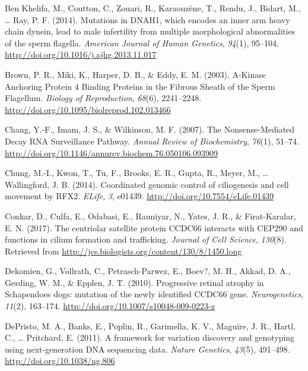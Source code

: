 \documentclass[12pt,twoside]{reedthesis}
\theoremstyle{definition}
\theoremstyle{definition}
\theoremstyle{remark}
\begin{document}
  \hypertarget{ref-BenKhelifa2014}{}
  Ben Khelifa, M., Coutton, C., Zouari, R., Karaouzène, T., Rendu, J.,
  Bidart, M., \ldots{} Ray, P. F. (2014). Mutations in DNAH1, which
  encodes an inner arm heavy chain dynein, lead to male infertility from
  multiple morphological abnormalities of the sperm flagella.
  \emph{American Journal of Human Genetics}, \emph{94}(1), 95--104.
  \url{http://doi.org/10.1016/j.ajhg.2013.11.017}
  
  \hypertarget{ref-Brown2003}{}
  Brown, P. R., Miki, K., Harper, D. B., \& Eddy, E. M. (2003). A-Kinase
  Anchoring Protein 4 Binding Proteins in the Fibrous Sheath of the Sperm
  Flagellum. \emph{Biology of Reproduction}, \emph{68}(6), 2241--2248.
  \url{http://doi.org/10.1095/biolreprod.102.013466}
  
  \hypertarget{ref-Chang2007}{}
  Chang, Y.-F., Imam, J. S., \& Wilkinson, M. F. (2007). The
  Nonsense-Mediated Decay RNA Surveillance Pathway. \emph{Annual Review of
  Biochemistry}, \emph{76}(1), 51--74.
  \url{http://doi.org/10.1146/annurev.biochem.76.050106.093909}
  
  \hypertarget{ref-Chung2014}{}
  Chung, M.-I., Kwon, T., Tu, F., Brooks, E. R., Gupta, R., Meyer, M.,
  \ldots{} Wallingford, J. B. (2014). Coordinated genomic control of
  ciliogenesis and cell movement by RFX2. \emph{ELife}, \emph{3}, e01439.
  \url{http://doi.org/10.7554/eLife.01439}
  
  \hypertarget{ref-Conkar2017}{}
  Conkar, D., Culfa, E., Odabasi, E., Rauniyar, N., Yates, J. R., \&
  Firat-Karalar, E. N. (2017). The centriolar satellite protein CCDC66
  interacts with CEP290 and functions in cilium formation and trafficking.
  \emph{Journal of Cell Science}, \emph{130}(8). Retrieved from
  \url{http://jcs.biologists.org/content/130/8/1450.long}
  
  \hypertarget{ref-Dekomien2010}{}
  Dekomien, G., Vollrath, C., Petrasch-Parwez, E., Boev?, M. H., Akkad, D.
  A., Gerding, W. M., \& Epplen, J. T. (2010). Progressive retinal atrophy
  in Schapendoes dogs: mutation of the newly identified CCDC66 gene.
  \emph{Neurogenetics}, \emph{11}(2), 163--174.
  \url{http://doi.org/10.1007/s10048-009-0223-z}
  
  \hypertarget{ref-DePristo2011}{}
  DePristo, M. A., Banks, E., Poplin, R., Garimella, K. V., Maguire, J.
  R., Hartl, C., \ldots{} Pritchard, E. (2011). A framework for variation
  discovery and genotyping using next-generation DNA sequencing data.
  \emph{Nature Genetics}, \emph{43}(5), 491--498.
  \url{http://doi.org/10.1038/ng.806}
  
\end{document}
